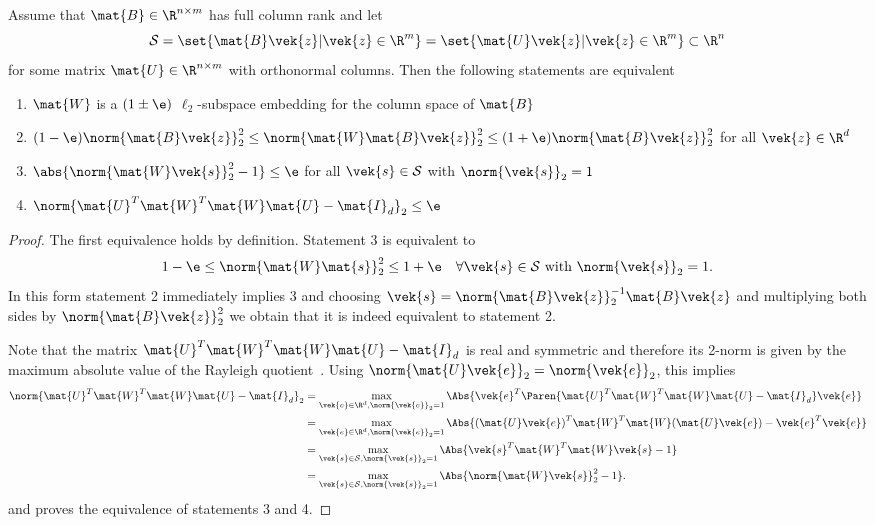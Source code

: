 \begin{theorem}
Assume that \(\mat{B} \in \R^{n \times m}\) has full column rank and let
\[\mathcal{S} = \set{ \mat{B}\vek{z} | \vek{z} \in \R^m } = \set{ \mat{U}\vek{z} | \vek{z} \in \R^m } \subset \R^n\]
for some matrix \(\mat{U} \in \R^{n \times m}\) with orthonormal columns.
Then the following statements are equivalent
\begin{enumerate}
  \item \(\mat{W}\) is a \((1\pm\e)\) \(\ell_2\)-subspace embedding for the column space of \(\mat{B}\)
  \item \((1-\e) \norm{\mat{B}\vek{z}}_2^2 \leq \norm{\mat{W}\mat{B}\vek{z}}_2^2 \leq (1+\e)\norm{\mat{B}\vek{z}}_2^2\) for all \(\vek{z} \in \R^d\)
  \item \(\abs{\norm{\mat{W}\vek{s}}_2^2 - 1} \leq \e\) for all \(\vek{s} \in \mathcal{S}\) with \(\norm{\vek{s}}_2 = 1\)
  \item \(\norm{\mat{U}^T \mat{W}^T \mat{W} \mat{U} - \mat{I}_d}_2 \leq \e\)
\end{enumerate}
\end{theorem}
\begin{proof}
The first equivalence holds by definition. Statement 3 is equivalent to
\[ 1-\e \leq \norm{\mat{W}\mat{s}}_2^2 \leq 1+\e \quad \forall \vek{s} \in \mathcal{S} \text{ with } \norm{\vek{s}}_2 = 1. \]
In this form statement 2 immediately implies 3 and choosing \(\vek{s} = \norm{\mat{B}\vek{z}}_2^{-1} \mat{B}\vek{z}\) and multiplying both sides by \(\norm{\mat{B}\vek{z}}_2^2\) we obtain that it is indeed equivalent to statement 2.

Note that the matrix \(\mat{U}^T \mat{W}^T \mat{W} \mat{U} - \mat{I}_d\) is real and symmetric and therefore its 2-norm is given by the maximum absolute value of the Rayleigh quotient~\cite[Equation (5.2)]{Demmel-AppliedNumericalLinearAlgebra}.
Using \(\norm{\mat{U}\vek{e}}_2 = \norm{\vek{e}}_2\), this implies
\begin{align*}
  \norm{\mat{U}^T \mat{W}^T \mat{W} \mat{U} - \mat{I}_d}_2
  &= \max_{\vek{e} \in \R^d, \norm{\vek{e}}_2 = 1} \Abs{\vek{e}^T \Paren{\mat{U}^T \mat{W}^T \mat{W} \mat{U} - \mat{I}_d} \vek{e} } \\
  &= \max_{\vek{e} \in \R^d, \norm{\vek{e}}_2 = 1} \Abs{{(\mat{U}\vek{e})}^T \mat{W}^T \mat{W} (\mat{U}\vek{e}) - \vek{e}^T \vek{e}} \\
  &= \max_{\vek{s} \in \mathcal{S}, \norm{\vek{s}}_2 = 1} \Abs{\vek{s}^T \mat{W}^T \mat{W} \vek{s} - 1} \\
  &= \max_{\vek{s} \in \mathcal{S}, \norm{\vek{s}}_2 = 1} \Abs{\norm{\mat{W}\vek{s}}_2^2 - 1}.
\end{align*}
and proves the equivalence of statements 3 and 4.
\end{proof}

